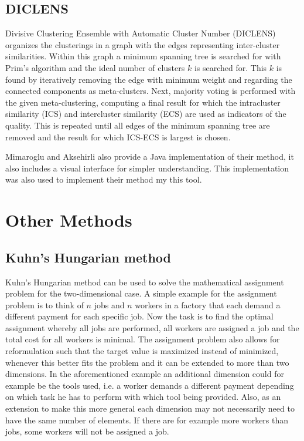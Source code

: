 \documentclass[
	a4paper,
	english,
	twoside,
	openright,               
	11pt                            
	]{report}
\begin{document}
\subsection{DICLENS}
Divisive Clustering Ensemble with Automatic Cluster Number (DICLENS) \cite{DICLENS} organizes the clusterings in a graph with the edges representing inter-cluster similarities. Within this graph a minimum spanning tree is searched for with Prim's algorithm \cite{prim} and the ideal number of clusters $k$ is searched for. This $k$ is found by iteratively removing the edge with minimum weight and regarding the connected components as meta-clusters. Next, majority voting is performed with the given meta-clustering, computing a final result for which the intracluster similarity (ICS) and intercluster similarity (ECS) are used as indicators of the quality. This is repeated until all edges of the minimum spanning tree are removed and the result for which ICS-ECS is largest is chosen.

Mimaroglu and Aksehirli \cite{DICLENS} also provide a Java implementation of their method, it also includes a visual interface for simpler understanding. This implementation was also used to implement their method my this tool.

\section{Other Methods}

\subsection{Kuhn’s Hungarian method}
Kuhn’s Hungarian method \cite{Kuhn2010} can be used to solve the mathematical assignment problem for the two-dimensional case. A simple example for the assignment problem is to think of $n$ jobs and $n$ workers in a factory that each demand a different payment for each specific job. Now the task is to find the optimal assignment whereby all jobs are performed, all workers are assigned a job and the total cost for all workers is minimal. The assignment problem also allows for reformulation such that the target value is maximized instead of minimized, whenever this better fits the problem and it can be extended to more than two dimensions. In the aforementioned example an additional dimension could for example be the tools used, i.e. a worker demands a different payment depending on which task he has to perform with which tool being provided. Also, as an extension to make this more general each dimension may not necessarily need to have the same number of elements. If there are for example more workers than jobs, some workers will not be assigned a job.
\end{document}
